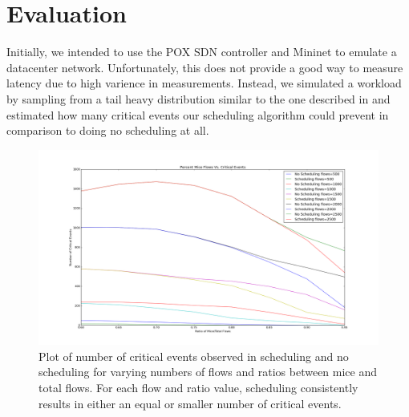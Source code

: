 \section{Evaluation}
Initially, we intended to use the POX SDN controller and Mininet to emulate a
datacenter network. Unfortunately, this does not provide a good way to measure
latency due to high varience in measurements. Instead, we simulated a workload
by sampling from a tail heavy distribution similar to the one described in
\cite{dctcp} and estimated how many critical events our scheduling algorithm
could prevent in comparison to doing no scheduling at all.

\begin{figure}[H]
	\centering
	\includegraphics[width=\columnwidth]{crit_plot.png}
	\caption{Plot of number of critical events observed in scheduling and no
    scheduling for varying numbers of flows and ratios between mice and total
    flows. For each flow and ratio value, scheduling consistently results in
    either an equal or smaller number of critical events.}
	\label{fig:critplt}
\end{figure}

